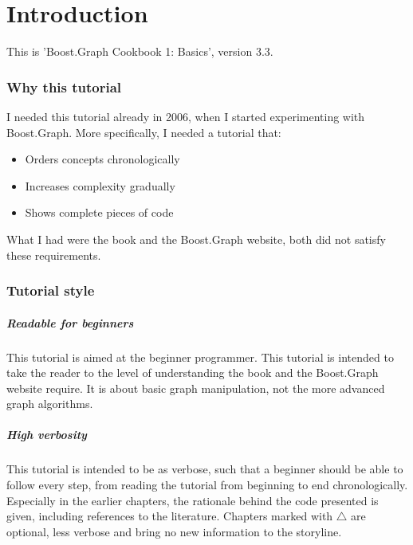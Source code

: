 \chapter{Introduction}

This is 'Boost.Graph Cookbook 1: Basics', version 3.3.

\subsection{Why this tutorial}

I needed this tutorial already in 2006, when I started experimenting with
Boost.Graph.
More specifically, I needed a tutorial that:

\begin{itemize}
  \item Orders concepts chronologically
  \item Increases complexity gradually
  \item Shows complete pieces of code
\end{itemize}

What I had were the book \cite{siek2001boost}
and the Boost.Graph website, both did not satisfy these requirements.

\subsection{Tutorial style}

\paragraph{Readable for beginners}

This tutorial is aimed at the beginner programmer.
This tutorial is intended to take the reader to the level of understanding
the book \cite{siek2001boost}
and the Boost.Graph website require.
It is about basic graph manipulation, not the more advanced graph algorithms.
 
\paragraph{High verbosity}

This tutorial is intended to be as verbose, 
such that a beginner should
be able to follow every step, 
from reading the tutorial from beginning
to end chronologically.
Especially in the earlier chapters, the rationale behind the code presented
is given, including references to the literature.
Chapters marked with $\triangle$ are optional, 
less verbose and bring no new information to the storyline.


